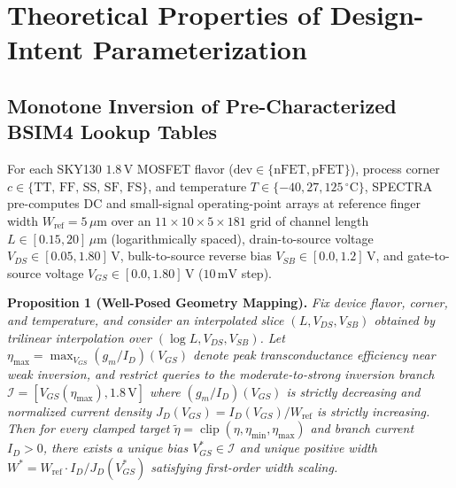 
\section{Theoretical Properties of Design-Intent Parameterization}
\label{app:theory}

\subsection{Monotone Inversion of Pre-Characterized BSIM4 Lookup Tables}
For each SKY130 $1.8\,\mathrm{V}$ MOSFET flavor ($\text{dev} \in \{\text{nFET}, \text{pFET}\}$), process corner $c \in \{\text{TT, FF, SS, SF, FS}\}$, and temperature $T \in \{-40, 27, 125\,^\circ\mathrm{C}\}$, \textsc{SPECTRA} pre-computes DC and small-signal operating-point arrays at reference finger width $W_{\text{ref}} = 5\,\mu\mathrm{m}$ over an $11 \times 10 \times 5 \times 181$ grid of channel length $L \in [0.15, 20]\,\mu\mathrm{m}$ (logarithmically spaced), drain-to-source voltage $V_{DS} \in [0.05, 1.80]\,\mathrm{V}$, bulk-to-source reverse bias $V_{SB} \in [0.0, 1.2]\,\mathrm{V}$, and gate-to-source voltage $V_{GS} \in [0.0, 1.80]\,\mathrm{V}$ ($10\,\mathrm{mV}$ step).

\textbf{Proposition 1 (Well-Posed Geometry Mapping).} \emph{Fix device flavor, corner, and temperature, and consider an interpolated slice $(L, V_{DS}, V_{SB})$ obtained by trilinear interpolation over $(\log L, V_{DS}, V_{SB})$. Let $\eta_{\max} = \max_{V_{GS}} (g_m / I_D)(V_{GS})$ denote peak transconductance efficiency near weak inversion, and restrict queries to the moderate-to-strong inversion branch $\mathcal{I} = [V_{GS}(\eta_{\max}), 1.8\,\mathrm{V}]$ where $(g_m / I_D)(V_{GS})$ is strictly decreasing and normalized current density $J_D(V_{GS}) = I_D(V_{GS}) / W_{\text{ref}}$ is strictly increasing. Then for every clamped target $\tilde{\eta} = \operatorname{clip}(\eta, \eta_{\min}, \eta_{\max})$ and branch current $I_D > 0$, there exists a unique bias $V_{GS}^* \in \mathcal{I}$ and unique positive width $W^* = W_{\text{ref}} \cdot I_D / J_D(V_{GS}^*)$ satisfying first-order width scaling.}

